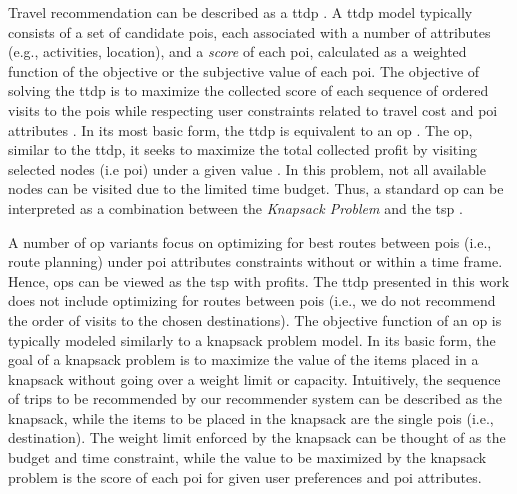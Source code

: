 Travel recommendation can be described as a \gls{ttdp} \parencite{Vansteenwegen2007TheOpportunity}. A \gls{ttdp} model typically consists of a set of candidate \glspl{poi}, each associated with a number of attributes (e.g., activities, location), and a \textit{score} of each \gls{poi}, calculated as a weighted function of the objective or the subjective value of each \gls{poi}. The objective of solving the \gls{ttdp} is to maximize the collected score of each sequence of ordered visits to the \glspl{poi} while respecting user constraints related to travel cost and \gls{poi} attributes \parencite{Survey_TTDP_Guavalas}. In its most basic form, the \gls{ttdp} is equivalent to an \gls{op} \parencite{Vansteenwegen2007TheOpportunity}. The \gls{op}, similar to the \gls{ttdp}, it seeks to maximize the total collected profit by visiting selected nodes (i.e \gls{poi}) under a given value \parencite{T.1984HeuristicOrienteering}. In this problem, not all available nodes can be visited due to the limited time budget. Thus, a standard \gls{op} can be interpreted as a combination between the \textit{Knapsack Problem} and the \gls{tsp} \parencite{OP_Solution_Gunawan}. 

A number of \gls{op} variants focus on optimizing for best routes between \glspl{poi} (i.e., route planning) under \gls{poi} attributes constraints without or within a time frame. Hence, \glspl{op} can be viewed as the \gls{tsp} with profits. The \gls{ttdp} presented in this work does not include optimizing for routes between \glspl{poi} (i.e., we do not recommend the order of visits to the chosen destinations). The objective function of an \gls{op} is typically modeled similarly to a knapsack problem model. In its basic form, the goal of a knapsack problem is to maximize the value of the items placed in a knapsack without going over a weight limit or capacity. Intuitively, the sequence of trips to be recommended by our recommender system can be described as the knapsack, while the items to be placed in the knapsack are the single \glspl{poi} (i.e., destination). The weight limit enforced by the knapsack can be thought of as the budget and time constraint, while the value to be maximized by the knapsack problem is the score of each \gls{poi} for given user preferences and \gls{poi} attributes.

